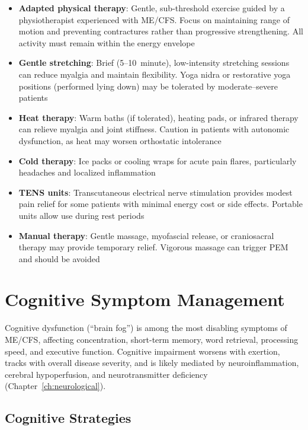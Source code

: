 \begin{itemize}
    \item \textbf{Adapted physical therapy}: Gentle, sub-threshold exercise guided by a physiotherapist experienced with ME/CFS. Focus on maintaining range of motion and preventing contractures rather than progressive strengthening. All activity must remain within the energy envelope
    \item \textbf{Gentle stretching}: Brief (5--10~minute), low-intensity stretching sessions can reduce myalgia and maintain flexibility. Yoga nidra or restorative yoga positions (performed lying down) may be tolerated by moderate--severe patients
    \item \textbf{Heat therapy}: Warm baths (if tolerated), heating pads, or infrared therapy can relieve myalgia and joint stiffness. Caution in patients with autonomic dysfunction, as heat may worsen orthostatic intolerance
    \item \textbf{Cold therapy}: Ice packs or cooling wraps for acute pain flares, particularly headaches and localized inflammation
    \item \textbf{TENS units}: Transcutaneous electrical nerve stimulation provides modest pain relief for some patients with minimal energy cost or side effects. Portable units allow use during rest periods
    \item \textbf{Manual therapy}: Gentle massage, myofascial release, or craniosacral therapy may provide temporary relief. Vigorous massage can trigger PEM and should be avoided
\end{itemize}

\section{Cognitive Symptom Management}
\label{sec:cognitive-management}

Cognitive dysfunction (``brain fog'') is among the most disabling symptoms of ME/CFS, affecting concentration, short-term memory, word retrieval, processing speed, and executive function. Cognitive impairment worsens with exertion, tracks with overall disease severity, and is likely mediated by neuroinflammation, cerebral hypoperfusion, and neurotransmitter deficiency (Chapter~\ref{ch:neurological}).

\subsection{Cognitive Strategies}

